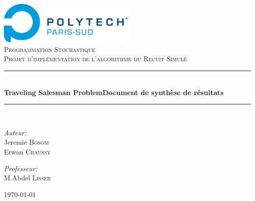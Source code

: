 \newcommand{\HRule}{\rule{\linewidth}{0.5mm}}

\begin{titlepage}
\begin{center}

\includegraphics[width=0.5\textwidth]{../polytech}~\\[1cm]

\textsc{\LARGE Programmation Stochastique}\\[1.5cm]

\textsc{\Large Projet d'implémentation de l'algorithme du Recuit Simulé}\\[0.5cm]

\HRule \\[0.4cm]
{ \huge \bfseries Traveling Salesman Problem\newline Document de synthèse de résultats\\[0.4cm] }
\HRule \\[1.5cm]

\begin{minipage}{0.4\textwidth}
\begin{flushleft} \large
\emph{Auteur:}\\
Jeremie \textsc{Bosom}\\
Erwan \textsc{Chaussy}
\end{flushleft}
\end{minipage}
\begin{minipage}{0.4\textwidth}
\begin{flushright} \large
\emph{Professeur:} \\
M.Abdel \textsc{Lisser}
\end{flushright}
\end{minipage}

\vfill

{\large \today}

\end{center}
\end{titlepage}
